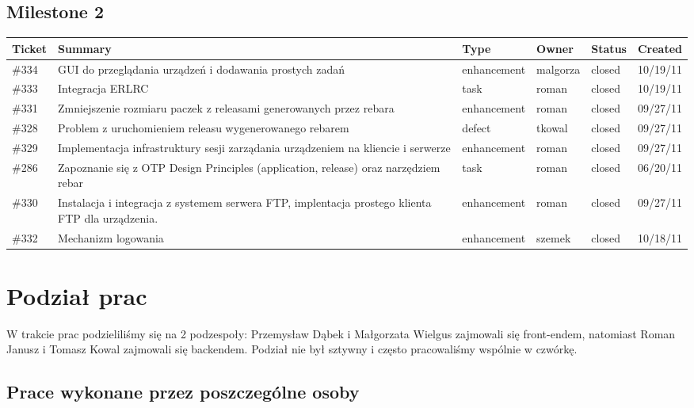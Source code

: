\documentclass[polish,12pt]{aghthesis} \usepackage[utf8]{inputenc}
\begin{document}
\subsection{Milestone 2}
\begin{tabular}{| p{1.3cm} | p{5cm} | p{2.5cm} | p{1.5cm} | p{1.5cm} | p{1.5cm} |}
\hline
Ticket & Summary & Type & Owner & Status & Created \\ \hline
\#334 & GUI do przeglądania urządzeń i dodawania prostych zadań & enhancement & malgorza & closed & 10/19/11 \\ \hline
\#333 & Integracja ERLRC & task & roman & closed & 10/19/11 \\ \hline
\#331 & Zmniejszenie rozmiaru paczek z releasami generowanych przez rebara & enhancement & roman & closed & 09/27/11 \\ \hline
\#328 & Problem z uruchomieniem releasu wygenerowanego rebarem & defect & tkowal & closed & 09/27/11 \\ \hline
\#329 & Implementacja infrastruktury sesji zarządania urządzeniem na kliencie i serwerze & enhancement & roman & closed & 09/27/11 \\ \hline
\#286 & Zapoznanie się z OTP Design Principles (application, release) oraz narzędziem rebar & task & roman & closed & 06/20/11 \\ \hline
\#330 & Instalacja i integracja z systemem serwera FTP, implentacja prostego klienta FTP dla urządzenia. & enhancement & roman & closed & 09/27/11 \\ \hline
\#332 & Mechanizm logowania & enhancement & szemek & closed & 10/18/11 \\ \hline
\end{tabular}

\section{Podział prac}
W trakcie prac podzieliliśmy się na 2 podzespoły: Przemysław Dąbek i Małgorzata Wielgus zajmowali się front-endem, natomiast Roman Janusz i Tomasz Kowal zajmowali się backendem. Podział nie był sztywny i często pracowaliśmy wspólnie w czwórkę.

\subsection{Prace wykonane przez poszczególne osoby}
\end{document}
